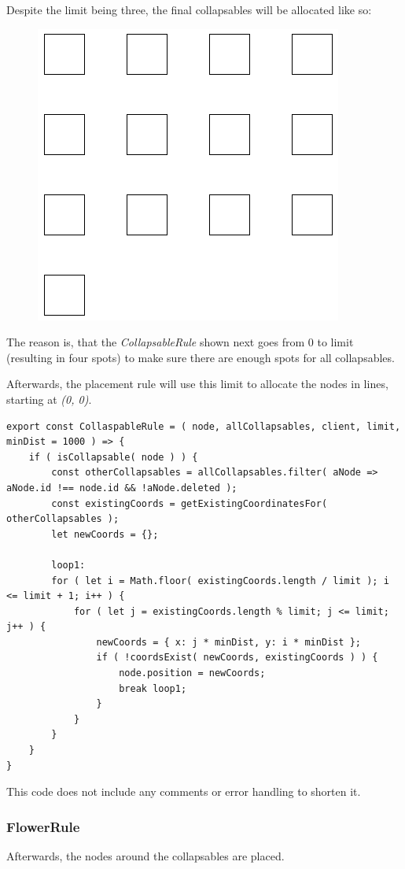 Despite the limit being three, the final collapsables will be allocated like so:
\begin{figure}[H]
\centering
\includegraphics[scale=.4]{Bilder/AllocRes.png}
\end{figure}

The reason is, that the \emph{CollapsableRule} shown next goes from 0 to limit (resulting in four spots) to make sure there are enough spots for all collapsables.

Afterwards, the placement rule will use this limit to allocate the nodes in lines, starting at \emph{(0, 0)}.
\begin{lstlisting}[caption={Placing all Collapsables}]
export const CollaspableRule = ( node, allCollapsables, client, limit, minDist = 1000 ) => {
	if ( isCollapsable( node ) ) {
		const otherCollapsables = allCollapsables.filter( aNode => aNode.id !== node.id && !aNode.deleted );
		const existingCoords = getExistingCoordinatesFor( otherCollapsables );
		let newCoords = {};

		loop1:
		for ( let i = Math.floor( existingCoords.length / limit ); i <= limit + 1; i++ ) {
			for ( let j = existingCoords.length % limit; j <= limit; j++ ) {
				newCoords = { x: j * minDist, y: i * minDist };
				if ( !coordsExist( newCoords, existingCoords ) ) {
					node.position = newCoords;
					break loop1;
				}
			}
		} 
	}
}
\end{lstlisting}
This code does not include any comments or error handling to shorten it.

\newpage
\subsubsection{FlowerRule}
Afterwards, the nodes around the collapsables are placed. 

